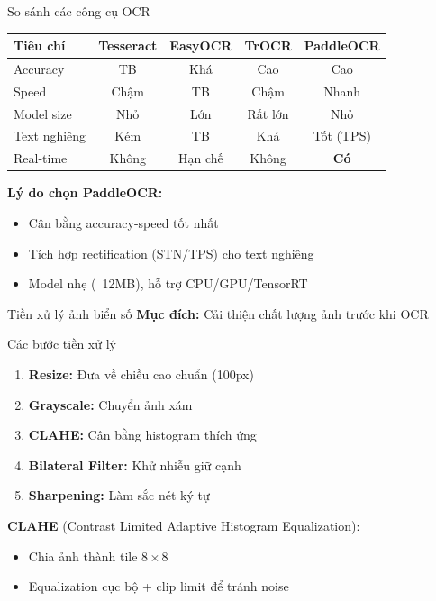 \begin{frame}{So sánh các công cụ OCR}
    \begin{table}
    \centering
    \footnotesize
    \begin{tabular}{|l|c|c|c|c|}
    \hline
    \textbf{Tiêu chí} & \textbf{Tesseract} & \textbf{EasyOCR} & \textbf{TrOCR} & \textbf{PaddleOCR} \\ \hline
    Accuracy & TB & Khá & Cao & Cao \\ \hline
    Speed & Chậm & TB & Chậm & Nhanh \\ \hline
    Model size & Nhỏ & Lớn & Rất lớn & Nhỏ \\ \hline
    Text nghiêng & Kém & TB & Khá & Tốt (TPS) \\ \hline
    Real-time & Không & Hạn chế & Không & \textbf{Có} \\ \hline
    \end{tabular}
    \end{table}
    
    \vspace{0.5em}
    \textbf{Lý do chọn PaddleOCR:}
    \begin{itemize}
        \item Cân bằng accuracy-speed tốt nhất
        \item Tích hợp rectification (STN/TPS) cho text nghiêng
        \item Model nhẹ (~12MB), hỗ trợ CPU/GPU/TensorRT
    \end{itemize}
\end{frame}

\begin{frame}{Tiền xử lý ảnh biển số}
    \textbf{Mục đích:} Cải thiện chất lượng ảnh trước khi OCR
    
    \begin{block}{Các bước tiền xử lý}
    \begin{enumerate}
        \item \textbf{Resize:} Đưa về chiều cao chuẩn (100px)
        \item \textbf{Grayscale:} Chuyển ảnh xám
        \item \textbf{CLAHE:} Cân bằng histogram thích ứng
        \item \textbf{Bilateral Filter:} Khử nhiễu giữ cạnh
        \item \textbf{Sharpening:} Làm sắc nét ký tự
    \end{enumerate}
    \end{block}
    
    \textbf{CLAHE} (Contrast Limited Adaptive Histogram Equalization):
    \begin{itemize}
        \item Chia ảnh thành tile $8 \times 8$
        \item Equalization cục bộ + clip limit để tránh noise
    \end{itemize}
\end{frame}

